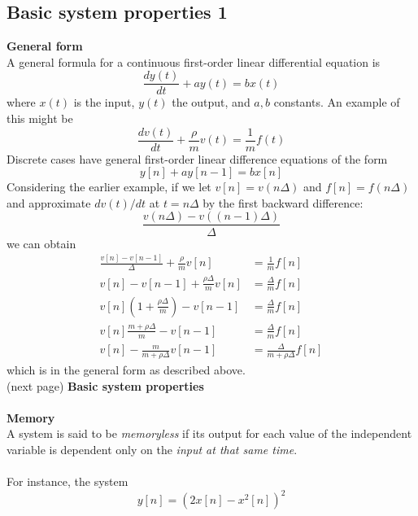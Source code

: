 \documentclass{report}
\begin{document}
\subsection{Basic system properties 1}
\textbf{General form}\\
A general formula for a continuous first-order linear differential equation is
\begin{equation*}
\frac{dy(t)}{dt}+ay(t)=bx(t)
\end{equation*}
where $x(t)$ is the input, $y(t)$ the output, and $a,b$ constants. An example of this might be
\begin{equation*}
\frac{dv(t)}{dt}+\frac{\rho}{m}v(t)=\frac{1}{m}f(t)
\end{equation*}
Discrete cases have general first-order linear difference equations of the form
\begin{equation*}
y[n]+ay[n-1]=bx[n]
\end{equation*}
Considering the earlier example, if we let $v[n]=v(n\Delta)$ and $f[n]=f(n\Delta)$ and approximate $dv(t)/dt$ at $t=n\Delta$ by
the first backward difference:
\begin{equation*}
\frac{v(n\Delta)-v((n-1)\Delta)}{\Delta}
\end{equation*}
we can obtain
\begin{align*}
\frac{v[n]-v[n-1]}{\Delta}+\frac{\rho}{m}v[n]&=\frac{1}{m}f[n]\\
v[n]-v[n-1]+\frac{\rho\Delta}{m}v[n]&=\frac{\Delta}{m}f[n]\\
v[n]\left(1+\frac{\rho\Delta}{m}\right)-v[n-1]&=\frac{\Delta}{m}f[n]\\
v[n]\frac{m+\rho\Delta}{m}-v[n-1]&=\frac{\Delta}{m}f[n]\\
v[n]-\frac{m}{m+\rho\Delta}v[n-1]&=\frac{\Delta}{m+\rho\Delta}f[n]
\end{align*}
which is in the general form as described above.\\
(next page)\newpage
\noindent\textbf{Basic system properties}\\
\vspace{1mm}\\
\textbf{Memory}\\
A system is said to be \textit{memoryless} if its output for each value of the independent variable is dependent
only on the \textit{input at that same time}.\\
\vspace{1mm}\\
For instance, the system 
\begin{equation*}
y[n]=(2x[n]-x^2[n])^2
\end{equation*}
\end{document}

